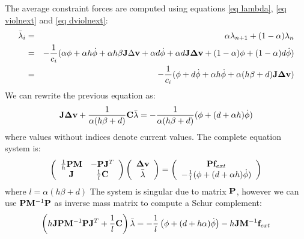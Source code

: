 The average constraint forces are computed  using equations \ref{eq lambda}, \ref{eq violnext} and \ref{eq dviolnext}:
\begin{eqnarray*}
 \avlam_i &=& \alpha \lnext + (1-\alpha) \lcur \\
&=& -\frac{1}{c_i} ( \alpha \violation + \alpha h \dviolation  + \alpha h \beta \J \Delta \vel + \alpha d \dviolation + \alpha d \J \dv + (1-\alpha)\violation + (1-\alpha) d \dviolation  ) \\
&=& -\frac{1}{c_i} ( \violation + d\dviolation + \alpha h \dviolation + \alpha(h\beta+d)\J \dv )
\end{eqnarray*}
We can rewrite the previous equation as:
\begin{equation} \label{eq bottom}
 \J \dv + \frac{1}{\alpha(h\beta+d)}\C\avlam = - \frac{1}{\alpha(h\beta+d)} (\violation + (d+\alpha h)\dviolation)
\end{equation}
where values without indices denote current values.
The complete equation system is:
\begin{equation}
 \left( \begin{array}{cc}
\frac{1}{h}\P\M & -\P\Jt \\
\J & \frac{1}{l} \C \end{array}\right)
\left( \begin{array}{c}
\dv \\ \avlam
\end{array}\right) = \left( \begin{array}{c}
\P\forcext  \\
- \frac{1}{l} (\violation +(d+\alpha h) \dviolation)
\end{array}\right) 
\end{equation}
where $ l=\alpha(h \beta + d) $
The system is singular due to matrix $\P $, however we can use $ \P \Minv\P $ as inverse mass matrix to compute a Schur complement:
\begin{equation} \label{eq schur complement}
 \left( h\J\P\Minv\P\Jt + \frac{1}{l}\C \right) \avlam = -\frac{1}{l} \left(\violation + (\dampingratio+h\alpha)\dviolation \right) - h\J \Minv \forcext
\end{equation}

